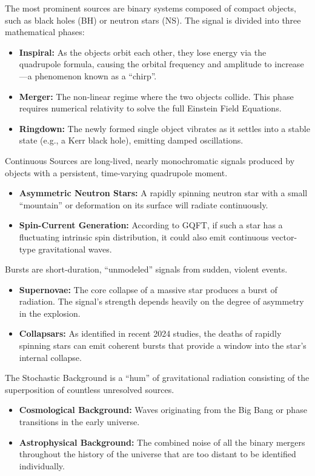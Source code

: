 The most prominent sources are binary systems composed of compact objects, such as black holes (BH) or neutron stars (NS). The signal is divided into three mathematical phases:
\begin{itemize}
  \item \textbf{Inspiral:} As the objects orbit each other, they lose energy via the quadrupole formula, causing the orbital frequency and amplitude to increase—a phenomenon known as a ``chirp''.
  \item \textbf{Merger:} The non-linear regime where the two objects collide. This phase requires numerical relativity to solve the full Einstein Field Equations.
  \item \textbf{Ringdown:} The newly formed single object vibrates as it settles into a stable state (e.g., a Kerr black hole), emitting damped oscillations.
\end{itemize}

Continuous Sources are long-lived, nearly monochromatic signals produced by objects with a persistent, time-varying quadrupole moment.
\begin{itemize}
  \item \textbf{Asymmetric Neutron Stars:} A rapidly spinning neutron star with a small ``mountain'' or deformation on its surface will radiate continuously.
  \item \textbf{Spin-Current Generation:} According to GQFT, if such a star has a fluctuating intrinsic spin distribution, it could also emit continuous vector-type gravitational waves.
\end{itemize}

Bursts are short-duration, ``unmodeled'' signals from sudden, violent events.
\begin{itemize}
  \item \textbf{Supernovae:} The core collapse of a massive star produces a burst of radiation. The signal's strength depends heavily on the degree of asymmetry in the explosion.
  \item \textbf{Collapsars:} As identified in recent 2024 studies, the deaths of rapidly spinning stars can emit coherent bursts that provide a window into the star's internal collapse.
\end{itemize}

The Stochastic Background is a ``hum'' of gravitational radiation consisting of the superposition of countless unresolved sources.
\begin{itemize}
  \item \textbf{Cosmological Background:} Waves originating from the Big Bang or phase transitions in the early universe.
  \item \textbf{Astrophysical Background:} The combined noise of all the binary mergers throughout the history of the universe that are too distant to be identified individually.
\end{itemize}

